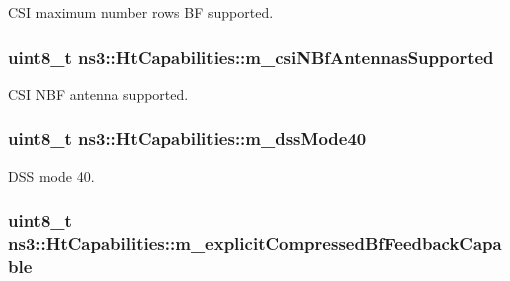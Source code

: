 C\+SI maximum number rows BF supported. 

\subsubsection[{\texorpdfstring{m\+\_\+csi\+N\+Bf\+Antennas\+Supported}{m_csiNBfAntennasSupported}}]{\setlength{\rightskip}{0pt plus 5cm}uint8\+\_\+t ns3\+::\+Ht\+Capabilities\+::m\+\_\+csi\+N\+Bf\+Antennas\+Supported\hspace{0.3cm}{\ttfamily [private]}}\hypertarget{classns3_1_1HtCapabilities_abd07898fcf99ad67706ba00724cd2cd6}{}\label{classns3_1_1HtCapabilities_abd07898fcf99ad67706ba00724cd2cd6}


C\+SI N\+BF antenna supported. 

\subsubsection[{\texorpdfstring{m\+\_\+dss\+Mode40}{m_dssMode40}}]{\setlength{\rightskip}{0pt plus 5cm}uint8\+\_\+t ns3\+::\+Ht\+Capabilities\+::m\+\_\+dss\+Mode40\hspace{0.3cm}{\ttfamily [private]}}\hypertarget{classns3_1_1HtCapabilities_a4c9abdb8fd14200504265569ca0d9a63}{}\label{classns3_1_1HtCapabilities_a4c9abdb8fd14200504265569ca0d9a63}


D\+SS mode 40. 

\subsubsection[{\texorpdfstring{m\+\_\+explicit\+Compressed\+Bf\+Feedback\+Capable}{m_explicitCompressedBfFeedbackCapable}}]{\setlength{\rightskip}{0pt plus 5cm}uint8\+\_\+t ns3\+::\+Ht\+Capabilities\+::m\+\_\+explicit\+Compressed\+Bf\+Feedback\+Capable\hspace{0.3cm}{\ttfamily [private]}}\hypertarget{classns3_1_1HtCapabilities_a1ee805003f1223d7c5bbdd74f63612c8}{}\label{classns3_1_1HtCapabilities_a1ee805003f1223d7c5bbdd74f63612c8}


